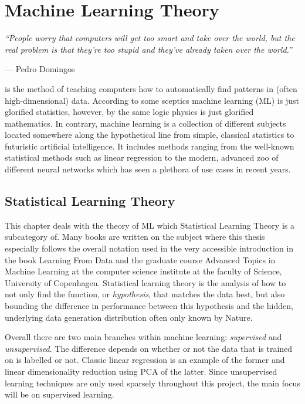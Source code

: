 
\chapter{Machine Learning Theory}
\label{ch:ML_theory}

\epigraph{\textit{``People worry that computers will get too smart and take over the world, but the real problem is that they're too stupid and they've already taken over the world.''}}{--- Pedro Domingos}

 is the method of teaching computers how to automatically find patterns in (often high-dimensional) data. According to some sceptics machine learning (ML) is just glorified statistics, however, by the same logic physics is just glorified mathematics. In contrary, machine learning is a collection of different subjects located somewhere along the hypothetical line from simple, classical statistics to futuristic artificial intelligence. It includes methods ranging from the well-known statistical methods such as linear regression to the modern, advanced zoo of different neural networks \citep{veenNeuralNetworkZoo2016} which has seen a plethora of use cases in recent years. 

\section{Statistical Learning Theory}
This chapter deals with the theory of ML which Statistical Learning Theory is a subcategory of. Many books are written on the subject where this thesis especially follows the overall notation used in the very accessible introduction in the book Learning From Data \citep{abu-mostafaLearningData2012} and the graduate course Advanced Topics in Machine Learning \citep{AdvancedTopicsMachine} at the computer science institute at the faculty of Science, University of Copenhagen. Statistical learning theory is the analysis of how to not only find the function, or \emph{hypothesis}, that matches the data best, but also bounding the difference in performance between this hypothesis and the hidden, underlying data generation distribution often only known by Nature. 

Overall there are two main branches within machine learning: \emph{supervised} and \emph{unsupervised}. The difference depends on whether or not the data that is trained on is labelled or not. Classic linear regression is an example of the former and linear dimensionality reduction using PCA of the latter. Since unsupervised learning techniques are only used sparsely throughout this project, the main focus will be on supervised learning. 

